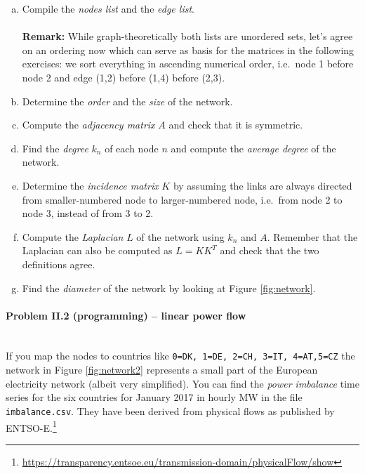 \documentclass[11pt,a4paper,fleqn]{scrartcl}
\begin{document}
\begin{enumerate}[(a)]
 \item Compile the \textit{nodes list} and the \textit{edge list}.\\~\\
       \textbf{Remark:} While graph-theoretically both lists are unordered sets, let's agree on an ordering now which can serve as basis for the matrices in the following exercises: we sort everything in ascending numerical order, i.e.\ node 1 before node 2 and edge (1,2) before (1,4) before (2,3).
 \item Determine the \textit{order} and the \textit{size} of the network.
 \item Compute the\textit{ adjacency matrix} $A$ and check that it is symmetric.
 \item Find the \textit{degree} $k_n$ of each node $n$ and compute the \textit{average degree} of the network.
 \item Determine the \textit{incidence matrix} $K$ by assuming the links are always directed from smaller-numbered node to larger-numbered node, i.e.\ from node 2 to node 3, instead of from 3 to 2.
 \item Compute the \textit{Laplacian} $L$ of the network using $k_n$ and $A$. Remember that the Laplacian can also be computed as $L=KK^T$ and check that the two definitions agree.
 \item Find the \textit{diameter} of the network by looking at Figure \ref{fig:network}.

\end{enumerate}

\pagebreak
\paragraph{Problem II.2 (programming) -- linear power flow}~\\



If you map the nodes to countries like \texttt{0=DK, 1=DE, 2=CH, 3=IT, 4=AT,5=CZ} the network in Figure \ref{fig:network2} represents a small part of the European electricity network (albeit very simplified). You can find the \textit{power imbalance} time series for the six countries for January 2017 in hourly MW in the file \texttt{imbalance.csv}. They have been derived from physical flows as published by ENTSO-E.\footnote{\url{https://transparency.entsoe.eu/transmission-domain/physicalFlow/show}}\\
\end{document}
